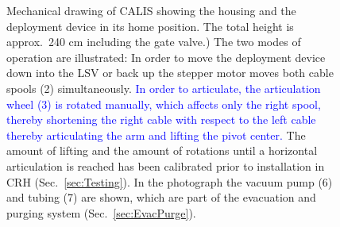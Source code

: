 \begin{figure}[htbp]
 \caption{Mechanical drawing of CALIS showing the housing and the deployment device in its home position. The total height is approx.~240 cm including the gate valve.) The two modes of operation are illustrated: In order to move the deployment device down into the LSV or back up the stepper motor moves both cable spools (2) simultaneously. \textcolor{blue}{In order to articulate, the articulation wheel (3) is rotated manually, which affects only the right spool, thereby shortening the right cable with respect to the left cable thereby articulating the arm and lifting the pivot center.} The amount of lifting and the amount of rotations until a horizontal articulation is reached has been calibrated prior to installation in CRH (Sec.~\ref{sec:Testing}). In the photograph the vacuum pump (6) and tubing (7) are shown, which are part of the evacuation and purging system (Sec.~\ref{sec:EvacPurge}). \label{fig:CALISDimensions}\label{fig:CALISMechanism}\label{fig:gearDrawing}\label{fig:flushing_purging}
}
\end{figure}

